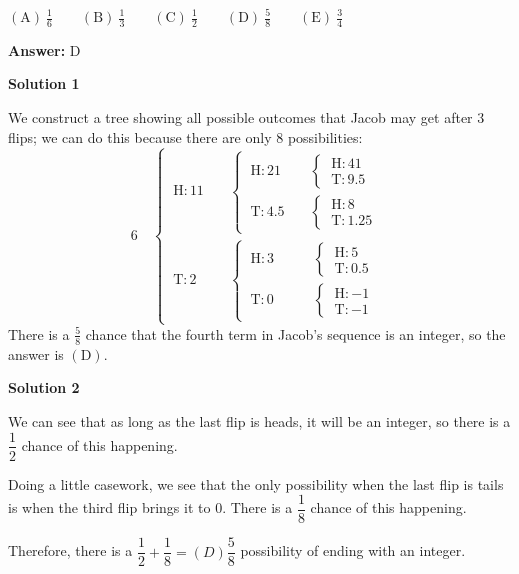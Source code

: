 \begin{enumerate}
 $\mathrm{(A)}\ \frac{1}{6}\qquad\mathrm{(B)}\ \frac{1}{3}\qquad\mathrm{(C)}\ \frac{1}{2}\qquad\mathrm{(D)}\ \frac{5}{8}\qquad\mathrm{(E)}\ \frac{3}{4}$

 \textbf{Answer: }D



\textbf{Solution 1}

We construct a tree showing all possible outcomes that Jacob may get after $3$ flips; we can do this because there are only $8$ possibilities:
 \[6\quad\begin{cases}  \ \text{H}: 11 &\quad  \begin{cases}  \ \text{H}: 21 &\quad \begin{cases} \ \text{H}: \boxed{41}\\ \ \text{T}: 9.5 \end{cases}\\  \ \text{T}: 4.5 &\quad \begin{cases} \ \text{H}: \boxed{8}\\ \ \text{T}: 1.25 \end{cases}  \end{cases}\\  \ \text{T}: 2 &\quad  \begin{cases}  \ \text{H}: 3 &\qquad\! \begin{cases} \ \text{H}: \boxed{5}\\ \ \text{T}: 0.5 \end{cases}\\  \ \text{T}: 0 &\qquad\! \begin{cases} \ \text{H}: \boxed{-1}\\ \ \text{T}: \boxed{-1} \end{cases} \end{cases} \end{cases}\]There is a $\frac{5}{8}$ chance that the fourth term in Jacob's sequence is an integer, so the answer is $\mathrm{(D)}$.

 



\textbf{Solution 2}

We can see that as long as the last flip is heads, it will be an integer, so there is a $\dfrac{1}{2}$ chance of this happening.

 Doing a little casework, we see that the only possibility when the last flip is tails is when the third flip brings it to 0. There is a $\dfrac{1}{8}$ chance of this happening.

 Therefore, there is a $\dfrac{1}{2}+\dfrac{1}{8}=\boxed{(D)\dfrac{5}{8}}$ possibility of ending with an integer.


\end{enumerate}
